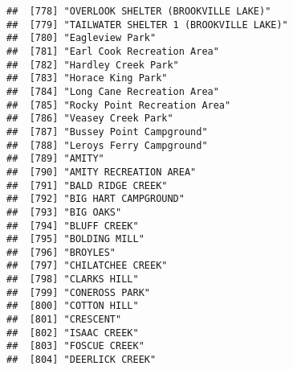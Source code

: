 \documentclass[
]{article}
\begin{document}
\begin{verbatim}
##  [778] "OVERLOOK SHELTER (BROOKVILLE LAKE)"                                                  
##  [779] "TAILWATER SHELTER 1 (BROOKVILLE LAKE)"                                               
##  [780] "Eagleview Park"                                                                      
##  [781] "Earl Cook Recreation Area"                                                           
##  [782] "Hardley Creek Park"                                                                  
##  [783] "Horace King Park"                                                                    
##  [784] "Long Cane Recreation Area"                                                           
##  [785] "Rocky Point Recreation Area"                                                         
##  [786] "Veasey Creek Park"                                                                   
##  [787] "Bussey Point Campground"                                                             
##  [788] "Leroys Ferry Campground"                                                             
##  [789] "AMITY"                                                                               
##  [790] "AMITY RECREATION AREA"                                                               
##  [791] "BALD RIDGE CREEK"                                                                    
##  [792] "BIG HART CAMPGROUND"                                                                 
##  [793] "BIG OAKS"                                                                            
##  [794] "BLUFF CREEK"                                                                         
##  [795] "BOLDING MILL"                                                                        
##  [796] "BROYLES"                                                                             
##  [797] "CHILATCHEE CREEK"                                                                    
##  [798] "CLARKS HILL"                                                                         
##  [799] "CONEROSS PARK"                                                                       
##  [800] "COTTON HILL"                                                                         
##  [801] "CRESCENT"                                                                            
##  [802] "ISAAC CREEK"                                                                         
##  [803] "FOSCUE CREEK"                                                                        
##  [804] "DEERLICK CREEK"                                                                      

\end{verbatim}
\end{document}
